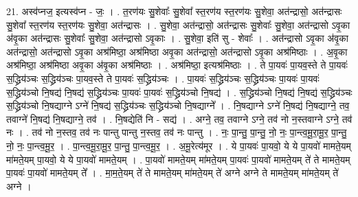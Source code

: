 \documentclass[17pt]{extarticle}
\begin{document}
21. अस्व॑प्नज॒ इत्यस्व॑प्न - जः॒ । . त॒रण॑यः सु॒शेवाः᳚ सु॒शेवा᳚ स्त॒रण॑य स्त॒रण॑यः सु॒शेवा॒ अत॑न्द्रासो॒ अत॑न्द्रासः सु॒शेवा᳚ स्त॒रण॑य स्त॒रण॑यः सु॒शेवा॒ अत॑न्द्रासः । . सु॒शेवा॒ अत॑न्द्रासो॒ अत॑न्द्रासः सु॒शेवाः᳚ सु॒शेवा॒ अत॑न्द्रासो ऽवृ॒का अ॑वृ॒का अत॑न्द्रासः सु॒शेवाः᳚ सु॒शेवा॒ अत॑न्द्रासो ऽवृ॒काः । . सु॒शेवा॒ इति॑ सु - शेवाः᳚ । . अत॑न्द्रासो ऽवृ॒का अ॑वृ॒का अत॑न्द्रासो॒ अत॑न्द्रासो ऽवृ॒का अश्र॑मिष्ठा॒ अश्र॑मिष्ठा अवृ॒का अत॑न्द्रासो॒ अत॑न्द्रासो ऽवृ॒का अश्र॑मिष्ठाः । . अ॒वृ॒का अश्र॑मिष्ठा॒ अश्र॑मिष्ठा अवृ॒का अ॑वृ॒का अश्र॑मिष्ठाः । . अश्र॑मिष्ठा॒ इत्यश्र॑मिष्ठाः । . ते पा॒यवः॑ पा॒यव॒स्ते ते पा॒यवः॑ स॒द्ध्रिय॑ञ्चः स॒द्ध्रिय॑ञ्चः पा॒यव॒स्ते ते पा॒यवः॑ स॒द्ध्रिय॑ञ्चः । . पा॒यवः॑ स॒द्ध्रिय॑ञ्चः स॒द्ध्रिय॑ञ्चः पा॒यवः॑ पा॒यवः॑ स॒द्ध्रिय॑ञ्चो नि॒षद्य॑ नि॒षद्य॑ स॒द्ध्रिय॑ञ्चः पा॒यवः॑ पा॒यवः॑ स॒द्ध्रिय॑ञ्चो नि॒षद्य॑ । . स॒द्ध्रिय॑ञ्चो नि॒षद्य॑ नि॒षद्य॑ स॒द्ध्रिय॑ञ्चः स॒द्ध्रिय॑ञ्चो नि॒षद्याग्ने ऽग्ने॑ नि॒षद्य॑ स॒द्ध्रिय॑ञ्चः स॒द्ध्रिय॑ञ्चो नि॒षद्याग्ने᳚ । . नि॒षद्याग्ने ऽग्ने॑ नि॒षद्य॑ नि॒षद्याग्ने॒ तव॒ तवाग्ने॑ नि॒षद्य॑ नि॒षद्याग्ने॒ तव॑ । . नि॒षद्येति॑ नि - सद्य॑ । . अग्ने॒ तव॒ तवाग्ने ऽग्ने॒ तव॑ नो न॒स्तवाग्ने ऽग्ने॒ तव॑ नः । . तव॑ नो न॒स्तव॒ तव॑ नः पान्तु पान्तु न॒स्तव॒ तव॑ नः पान्तु । . नः॒ पा॒न्तु॒ पा॒न्तु॒ नो॒ नः॒ पा॒न्त्व॒मू॒रा॒मू॒र॒ पा॒न्तु॒ नो॒ नः॒ पा॒न्त्व॒मू॒र॒ । . पा॒न्त्व॒मू॒रा॒मू॒र॒ पा॒न्तु॒ पा॒न्त्व॒मू॒र॒ । . अ॒मू॒रेत्य॑मूर । . ये पा॒यवः॑ पा॒यवो॒ ये ये पा॒यवो॑ मामते॒यम् मा॑मते॒यम् पा॒यवो॒ ये ये पा॒यवो॑ मामते॒यम् । . पा॒यवो॑ मामते॒यम् मा॑मते॒यम् पा॒यवः॑ पा॒यवो॑ मामते॒यम् ते॑ ते मामते॒यम् पा॒यवः॑ पा॒यवो॑ मामते॒यम् ते᳚ । . मा॒म॒ते॒यम् ते॑ ते मामते॒यम् मा॑मते॒यम् ते॑ अग्ने अग्ने ते मामते॒यम् मा॑मते॒यम् ते॑ अग्ने । \newline
\end{document}
